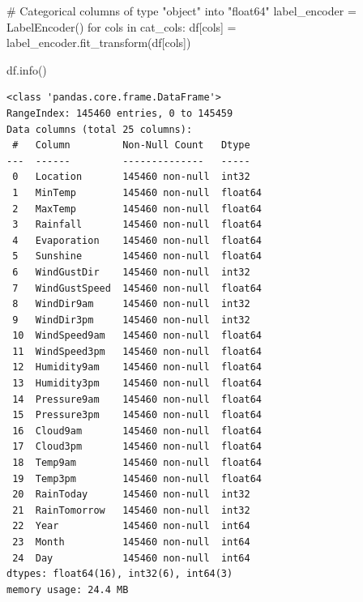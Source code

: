 \documentclass[
  letterpaper,
  DIV=11,
  numbers=noendperiod]{scrartcl}
\newenvironment{Shaded}{\begin{snugshade}}{\end{snugshade}}
\newcommand{\CommentTok}[1]{\textcolor[rgb]{0.37,0.37,0.37}{#1}}
\newcommand{\ControlFlowTok}[1]{\textcolor[rgb]{0.00,0.23,0.31}{#1}}
\newcommand{\KeywordTok}[1]{\textcolor[rgb]{0.00,0.23,0.31}{#1}}
\newcommand{\NormalTok}[1]{\textcolor[rgb]{0.00,0.23,0.31}{#1}}
\newcommand{\OperatorTok}[1]{\textcolor[rgb]{0.37,0.37,0.37}{#1}}
\begin{document}
\begin{Shaded}
\begin{Highlighting}[]
\CommentTok{\# Categorical columns of type "object" into "float64"}
\NormalTok{label\_encoder }\OperatorTok{=}\NormalTok{ LabelEncoder()}
\ControlFlowTok{for}\NormalTok{ cols }\KeywordTok{in}\NormalTok{ cat\_cols: }
\NormalTok{    df[cols] }\OperatorTok{=}\NormalTok{ label\_encoder.fit\_transform(df[cols])}

    
\NormalTok{df.info()}
\end{Highlighting}
\end{Shaded}

\begin{verbatim}
<class 'pandas.core.frame.DataFrame'>
RangeIndex: 145460 entries, 0 to 145459
Data columns (total 25 columns):
 #   Column         Non-Null Count   Dtype  
---  ------         --------------   -----  
 0   Location       145460 non-null  int32  
 1   MinTemp        145460 non-null  float64
 2   MaxTemp        145460 non-null  float64
 3   Rainfall       145460 non-null  float64
 4   Evaporation    145460 non-null  float64
 5   Sunshine       145460 non-null  float64
 6   WindGustDir    145460 non-null  int32  
 7   WindGustSpeed  145460 non-null  float64
 8   WindDir9am     145460 non-null  int32  
 9   WindDir3pm     145460 non-null  int32  
 10  WindSpeed9am   145460 non-null  float64
 11  WindSpeed3pm   145460 non-null  float64
 12  Humidity9am    145460 non-null  float64
 13  Humidity3pm    145460 non-null  float64
 14  Pressure9am    145460 non-null  float64
 15  Pressure3pm    145460 non-null  float64
 16  Cloud9am       145460 non-null  float64
 17  Cloud3pm       145460 non-null  float64
 18  Temp9am        145460 non-null  float64
 19  Temp3pm        145460 non-null  float64
 20  RainToday      145460 non-null  int32  
 21  RainTomorrow   145460 non-null  int32  
 22  Year           145460 non-null  int64  
 23  Month          145460 non-null  int64  
 24  Day            145460 non-null  int64  
dtypes: float64(16), int32(6), int64(3)
memory usage: 24.4 MB
\end{verbatim}
\end{document}
